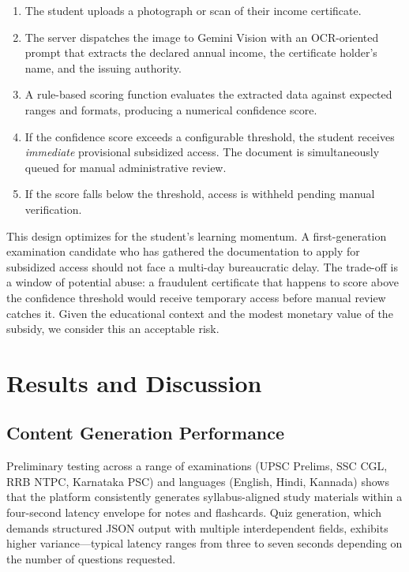 \documentclass[conference]{IEEEtran}
\begin{document}
\begin{enumerate}[leftmargin=*]
    \item The student uploads a photograph or scan of their income certificate.
    \item The server dispatches the image to Gemini Vision with an OCR-oriented prompt that extracts the declared annual income, the certificate holder's name, and the issuing authority.
    \item A rule-based scoring function evaluates the extracted data against expected ranges and formats, producing a numerical confidence score.
    \item If the confidence score exceeds a configurable threshold, the student receives \textit{immediate} provisional subsidized access. The document is simultaneously queued for manual administrative review.
    \item If the score falls below the threshold, access is withheld pending manual verification.
\end{enumerate}

This design optimizes for the student's learning momentum. A first-generation examination candidate who has gathered the documentation to apply for subsidized access should not face a multi-day bureaucratic delay. The trade-off is a window of potential abuse: a fraudulent certificate that happens to score above the confidence threshold would receive temporary access before manual review catches it. Given the educational context and the modest monetary value of the subsidy, we consider this an acceptable risk.

\section{Results and Discussion}
\label{sec:results}

\subsection{Content Generation Performance}

Preliminary testing across a range of examinations (UPSC Prelims, SSC CGL, RRB NTPC, Karnataka PSC) and languages (English, Hindi, Kannada) shows that the platform consistently generates syllabus-aligned study materials within a four-second latency envelope for notes and flashcards. Quiz generation, which demands structured JSON output with multiple interdependent fields, exhibits higher variance---typical latency ranges from three to seven seconds depending on the number of questions requested.
\end{document}
